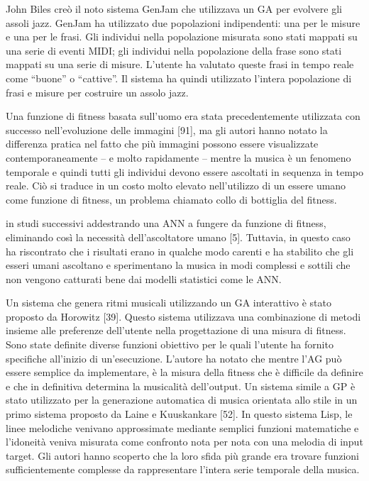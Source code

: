 \documentclass[a4paper,12pt]{report}
\begin{document}
John Biles creò il noto sistema GenJam che utilizzava un GA per evolvere gli assoli jazz. 
GenJam ha utilizzato due popolazioni indipendenti: una per le misure e una per le frasi. 
Gli individui nella popolazione misurata sono stati mappati su una serie di eventi MIDI; 
gli individui nella popolazione della frase sono stati mappati su una serie di misure. 
L’utente ha valutato queste frasi in tempo reale come “buone” o “cattive”. 
Il sistema ha quindi utilizzato l'intera popolazione di frasi e misure per costruire un assolo jazz. 

Una funzione di fitness basata sull’uomo era stata precedentemente utilizzata con successo nell’evoluzione delle immagini [91], ma gli autori hanno notato la differenza pratica nel fatto che più immagini possono essere visualizzate contemporaneamente – e molto rapidamente – mentre la musica è un fenomeno temporale e quindi tutti gli individui devono essere ascoltati in sequenza in tempo reale. Ciò si traduce in un costo molto elevato nell’utilizzo di un essere umano come funzione di fitness, un problema chiamato collo di bottiglia del fitness.

in studi successivi addestrando una ANN a fungere da funzione di fitness, eliminando così la necessità dell'ascoltatore umano [5]. Tuttavia, in questo caso ha riscontrato che i risultati erano in qualche modo carenti e ha stabilito che gli esseri umani ascoltano e sperimentano la musica in modi complessi e sottili che non vengono catturati bene dai modelli statistici come le ANN. 

Un sistema che genera ritmi musicali utilizzando un GA interattivo è stato proposto da Horowitz [39]. 
Questo sistema utilizzava una combinazione di metodi insieme alle preferenze dell'utente nella progettazione di una misura di fitness. 
Sono state definite diverse funzioni obiettivo per le quali l'utente ha fornito specifiche all'inizio di un'esecuzione. L'autore ha notato che mentre l'AG può essere semplice da implementare, è la misura della fitness che è difficile da definire e che in definitiva determina la musicalità dell'output. Un sistema simile a GP è stato utilizzato per la generazione automatica di musica orientata allo stile in un primo sistema proposto da Laine e Kuuskankare [52]. In questo sistema Lisp, le linee melodiche venivano approssimate mediante semplici funzioni matematiche e l'idoneità veniva misurata come confronto nota per nota con una melodia di input target. Gli autori hanno scoperto che la loro sfida più grande era trovare funzioni sufficientemente complesse da rappresentare l’intera serie temporale della musica.
\end{document}

